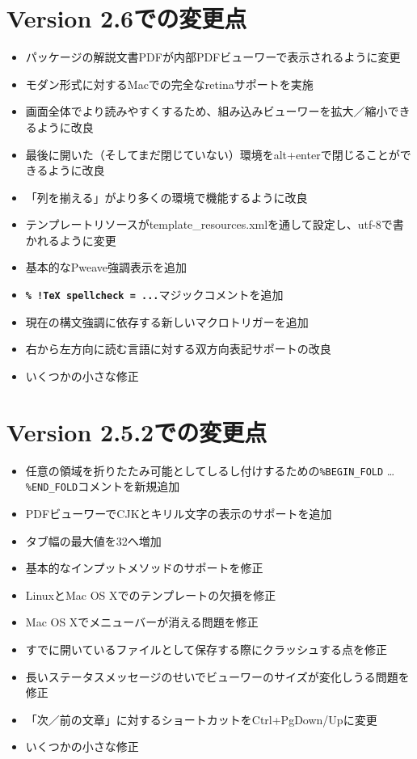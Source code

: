 \section{Version 2.6での変更点}

\begin{itemize}
\item
  パッケージの解説文書PDFが内部PDFビューワーで表示されるように変更
\item
  モダン形式に対するMacでの完全なretinaサポートを実施
\item
  画面全体でより読みやすくするため、組み込みビューワーを拡大／縮小できるように改良
\item
  最後に開いた（そしてまだ閉じていない）環境をalt+enterで閉じることができるように改良
\item
  「列を揃える」がより多くの環境で機能するように改良
\item
  テンプレートリソースがtemplate\_resources.xmlを通して設定し、utf-8で書かれるように変更
\item
  基本的なPweave強調表示を追加
\item
  \textbf{\texttt{\% !TeX spellcheck = ...}}マジックコメントを追加
\item
  現在の構文強調に依存する新しいマクロトリガーを追加
\item
  右から左方向に読む言語に対する双方向表記サポートの改良
\item
  いくつかの小さな修正
\end{itemize}

\section{Version 2.5.2での変更点}

\begin{itemize}
\item
  任意の領域を折りたたみ可能としてしるし付けするための\verb+%BEGIN_FOLD+
  \ldots{} \verb+%END_FOLD+コメントを新規追加
\item
  PDFビューワーでCJKとキリル文字の表示のサポートを追加
\item
  タブ幅の最大値を32へ増加
\item
  基本的なインプットメソッドのサポートを修正
\item
  LinuxとMac OS Xでのテンプレートの欠損を修正
\item
  Mac OS Xでメニューバーが消える問題を修正
\item
  すでに開いているファイルとして保存する際にクラッシュする点を修正
\item
  長いステータスメッセージのせいでビューワーのサイズが変化しうる問題を修正
\item
  「次／前の文章」に対するショートカットをCtrl+PgDown/Upに変更
\item
  いくつかの小さな修正
\end{itemize}

